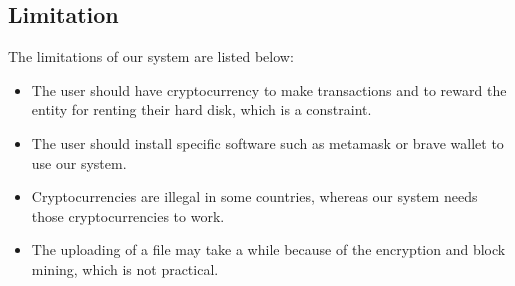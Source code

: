 
\subsection{Limitation}

The limitations of our system are listed below: \\

\begin{itemize}
\item The user should have cryptocurrency to make transactions and to reward the entity for renting their hard disk, which is a constraint.
\item The user should install specific software such as metamask or brave wallet to use our system.
\item Cryptocurrencies are illegal in some countries, whereas our system needs those cryptocurrencies to work.
\item The uploading of a file may take a while because of the encryption and block mining, which is not practical.
\end{itemize}